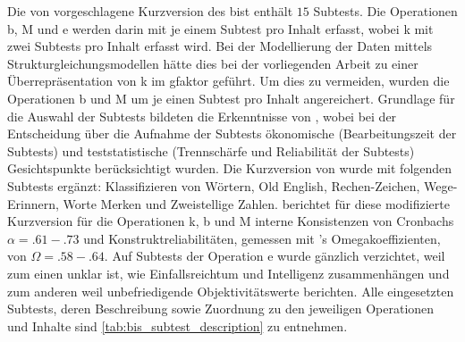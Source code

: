 \documentclass[11pt, twoside, a4paper]{book}		%
\begin{document}
Die von \citet{Jaeger1997} vorgeschlagene Kurzversion des \gls{bist} enthält $15$ Subtests. Die Operationen \gls{b}, \gls{M} und \gls{e} werden darin mit je einem Subtest pro Inhalt erfasst, wobei \gls{k} mit zwei Subtests pro Inhalt erfasst wird. Bei der Modellierung der Daten mittels Strukturgleichungsmodellen hätte dies bei der vorliegenden Arbeit zu einer Überrepräsentation von \gls{k} im \gls{gfaktor} geführt. Um dies zu vermeiden, wurden die Operationen \gls{b} und \gls{M} um je einen Subtest pro Inhalt angereichert. Grundlage für die Auswahl der Subtests bildeten die Erkenntnisse von \citet{Wicki2014}, wobei bei der Entscheidung über die Aufnahme der Subtests ökonomische (Bearbeitungszeit der Subtests) und teststatistische (Trennschärfe und Reliabilität der Subtests)  Gesichtspunkte berücksichtigt wurden. Die Kurzversion von \citet{Jaeger1997} wurde mit folgenden Subtests ergänzt: Klassifizieren von Wörtern, Old English, Rechen-Zeichen, Wege-Erinnern, Worte Merken und Zweistellige Zahlen. 
\citet{Wicki2014} berichtet für diese modifizierte Kurzversion für die Operationen \gls{k}, \gls{b} und \gls{M} interne Konsistenzen von Cronbachs $\alpha=.61-.73$ und Konstruktreliabilitäten, gemessen mit \citeauthor{McDonald1999}'s \citeyearpar{McDonald1999} Omegakoeffizienten, von $\Omega = .58-.64$.
Auf Subtests der Operation \gls{e} wurde gänzlich verzichtet, weil zum einen unklar ist, wie Einfallsreichtum und Intelligenz zusammenhängen \citep{Kim2005} und zum anderen weil \citet{Jaeger1997} unbefriedigende Objektivitätswerte berichten. 
Alle eingesetzten Subtests, deren Beschreibung sowie Zuordnung zu den jeweiligen Operationen und Inhalte sind \autoref{tab:bis_subtest_description} zu entnehmen.
\end{document}
